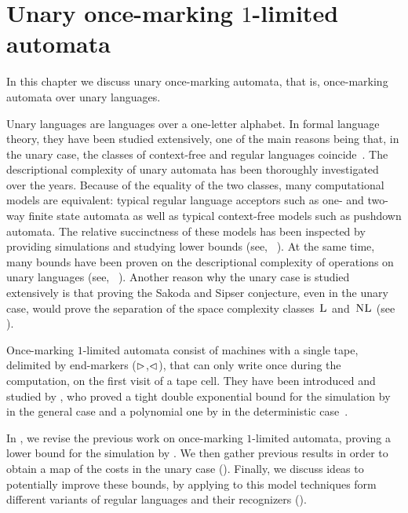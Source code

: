 \chapter{Unary once-marking \texorpdfstring{$1$}{1}-limited automata}\label{ch:oncemarking}
In this chapter we discuss unary once-marking automata, that is, once-marking automata over unary languages.

Unary languages are languages over a one-letter alphabet.
In formal language theory, they have been studied extensively, one of the main reasons being that, in the unary case, the classes of context-free and regular languages coincide~\cite{GinRic62}.
The descriptional complexity of unary automata has been thoroughly investigated over the years.
Because of the equality of the two classes, many computational models are equivalent: typical regular language acceptors such as one- and two-way finite state automata as well as typical context-free models such as pushdown automata.
The relative succinctness of these models has been inspected by providing simulations and studying lower bounds (see, \eg[,]~\cite{GefMer+03,MerPig01,Pig09,PigSha+02}).
At the same time, many bounds have been proven on the descriptional complexity of operations on unary languages (see, \eg[,]~\cite{HolKut03,KunOkh12,MerPig05,PigSha02}).
Another reason why the unary case is studied extensively is that proving the Sakoda and Sipser conjecture, even in the unary case, would prove the separation of the space complexity classes~$\textsc{L}$ and~$\textsc{NL}$ (see ).

Once-marking $1$-limited automata consist of machines with a single tape, delimited by end-markers ($\rhd$,$\lhd$), that can only write once during the computation, on the first visit of a tape cell.
They have been introduced and studied by \citeauthor{PigPri23a}, who proved a tight double exponential bound for the simulation by \ODFAs in the general case and a polynomial one by \TDFAs in the deterministic case~\cite{PigPri23a}.

In , we revise the previous work on once-marking $1$-limited automata, proving a lower bound for the simulation by \ONFAs.
We then gather previous results in order to obtain a map of the costs in the unary case ().
Finally, we discuss ideas to potentially improve these bounds, by applying to this model techniques form different variants of regular languages and their recognizers ().



